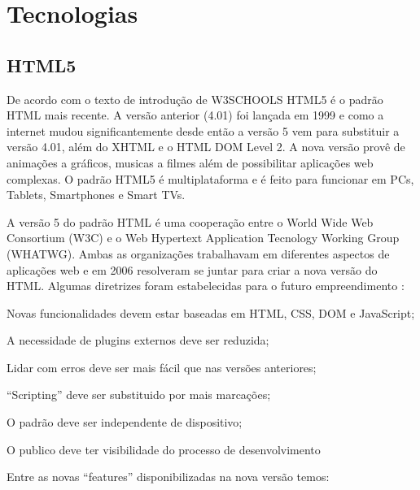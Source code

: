 \part{Tecnologias}

\chapter{HTML5}
De acordo com o texto de introdução de W3SCHOOLS HTML5 é o padrão HTML mais recente. A versão anterior (4.01) foi lançada em 1999 e como a internet mudou significantemente desde então a versão 5 vem para substituir a versão 4.01, além do XHTML e o HTML DOM Level 2. A nova versão provê de animações a gráficos, musicas a filmes além de possibilitar aplicações web complexas. O padrão HTML5 é multiplataforma e é feito para funcionar em PCs, Tablets, Smartphones e Smart TVs.

	A versão 5 do padrão HTML é uma cooperação entre o World Wide Web Consortium (W3C) e o Web Hypertext Application Tecnology Working Group (WHATWG). Ambas as organizações trabalhavam em diferentes aspectos de aplicações web e em 2006 resolveram se juntar para criar a nova versão do HTML. Algumas diretrizes foram estabelecidas para o futuro empreendimento \cite{htmlInt}:

\begin{alineas}

\item Novas funcionalidades devem estar baseadas em HTML, CSS, DOM e JavaScript;

\item A necessidade de plugins externos deve ser reduzida;

\item Lidar com erros deve ser mais fácil que nas versões anteriores;

\item “Scripting” deve ser substituido por mais marcações;

\item O padrão deve ser independente de dispositivo;

\item O publico deve ter visibilidade do processo de desenvolvimento

\end{alineas}

Entre as novas “features” disponibilizadas na nova versão temos:

